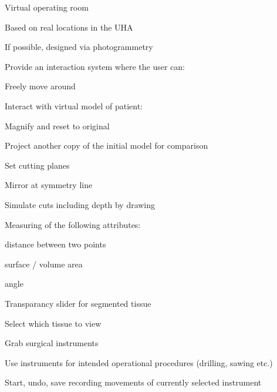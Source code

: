 \begin{compactenum}[label=(\alph*)]
    \item Virtual operating room
        \begin{compactenum}[label=(\alph*)]
            \item Based on real locations in the UHA
            \item If possible, designed via photogrammetry
        \end{compactenum}
    \item Provide an interaction system where the user can:
        \begin{compactenum}[label=(\alph*)]
            \item Freely move around
            \item Interact with virtual model of patient:
                \begin{compactenum}[label=(\alph*)]
                    \item Magnify and reset to original
                    \item Project another copy of the initial model for comparison
                    \item Set cutting planes
                    \item Mirror at symmetry line
                    \item Simulate cuts including depth by drawing
                    \item Measuring of the following attributes:
                        \begin{compactenum}[label=(\alph*)]
                            \item distance between two points
                            \item surface / volume area
                            \item angle
                        \end{compactenum}
                    \item Transparancy slider for segmented tissue
                    \item Select which tissue to view
                \end{compactenum}
            \item Grab surgical instruments
            \item Use instruments for intended operational procedures (drilling, sawing etc.)
            \item Start, undo, save recording movements of currently selected instrument 

\end{compactenum}
\end{compactenum}
